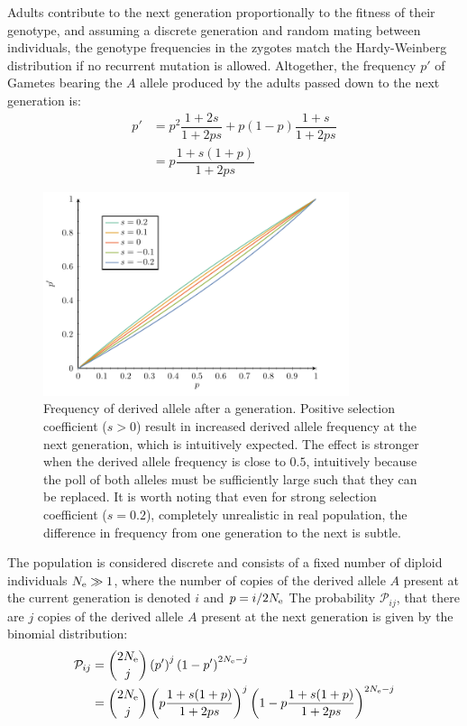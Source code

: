Adults contribute to the next generation proportionally to the fitness of their genotype, and assuming a discrete generation and random mating between individuals, the genotype frequencies in the zygotes match the Hardy-Weinberg distribution if no recurrent mutation is allowed.
Altogether, the frequency $p'$ of \glspl{Gamete} bearing the $A$ \gls{allele} produced by the adults passed down to the next generation is:
\begin{align}
p' & = p^2 \dfrac{1+2s}{1+2ps} + p(1-p)\dfrac{1+s}{1+2ps}\\
& = p\dfrac{1+s(1+p)}{1 + 2ps}
\end{align}

\begin{figure}[H]
	\centering
	\includegraphics[width=0.8\textwidth, page=1] {figures.pdf}
	\caption[Frequency of derived \gls{allele} after a generation]{
	Frequency of derived \gls{allele} after a generation.
	Positive selection coefficient ($s > 0$) result in increased derived \gls{allele} frequency at the next generation, which is intuitively expected.
	The effect is stronger when the derived \gls{allele} frequency is close to $0.5$, intuitively because the poll of both \glspl{allele} must be sufficiently large such that they can be replaced.
	It is worth noting that even for strong selection coefficient ($s=0.2$), completely unrealistic in real population, the difference in frequency from one generation to the next is subtle.}
\end{figure}

The population is considered discrete and consists of a fixed number of \gls{diploid} individuals $N_{\textrm{e}} \gg 1$, where the number of copies of the derived \gls{allele} $A$ present at the current generation is denoted $i$ and $p=i / 2N_{\textrm{e}} $ 
The probability $\mathcal{P}_{ij}$, that there are $j$ copies of the derived \gls{allele} $A$ present at the next generation is given by the binomial distribution:
\begin{align}
\mathcal{P}_{ij} & = \binom{2 N_{\textrm{e}}}{j} \left( p' \right)^j \left(1 - p' \right)^{2 N_{\textrm{e}} -j} \\
				 & = \binom{2 N_{\textrm{e}}}{j} \left( p\dfrac{1+s(1+p)}{1 + 2ps} \right)^j \left(1 - p\dfrac{1+s(1+p)}{1 + 2ps} \right)^{2 N_{\textrm{e}} -j}
\end{align}


